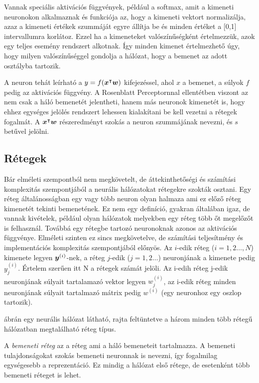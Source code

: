 Vannak speciális aktivációs függvények, például a softmax, amit a kimeneti neuronokon alkalmaznak és funkciója az, hogy a kimeneti vektort normalizálja, azaz a kimeneti értékek szummáját egyre állítja be és minden értéket a [0,1] intervallumra korlátoz. Ezzel ha a kimeneteket valószínűségként értelmezzük, azok egy teljes esemény rendszert alkotnak. Így minden kimenet értelmezhető úgy, hogy milyen valószínűséggel gondolja a hálózat, hogy a bemenet az adott osztályba tartozik.


A neuron tehát leírható a $y = f(\boldsymbol x^\intercal \boldsymbol w)$ kifejezéssel, ahol $x$ a bemenet, \w a súlyok $f$ pedig az aktivációs függvény. A Rosenblatt Perceptornnal ellentétben viszont az \x nem csak a háló bemenetét jelentheti, hanem más neuronok kimenetét is, hogy ehhez egységes jelölés rendszert lehessen kialakítani be kell vezetni a rétegek fogalmát. A $\boldsymbol x^\intercal \boldsymbol w$ részeredményt szokás a neuron szummájának nevezni, és $s$ betűvel jelölni.
 
 
 
 \subsection{Rétegek}
 
Bár elméleti szempontból nem megkövetelt, de áttekinthetőségi és számítási komplexitás szempontjából a neurális hálózatokat rétegekre szokták osztani. Egy réteg általánosságban egy vagy több neuron olyan halmaza ami ez előző réteg kimenetét tekinti bemenetének. Ez nem egy definíció, gyakran általában igaz, de vannak kivételek, például olyan hálózatok melyekben egy réteg több őt megelőzőt is felhasznál. Továbbá  egy rétegbe tartozó neuronoknak azonos az aktivációs függvénye. Elméleti szinten ez sincs megkövetelve, de számítási teljesítmény és implementációs komplexitás szempontjából előnyös.
Az $i$-edik réteg ($i = 1,2\dots, N$) kimenete legyen $\boldsymbol y^{(i)}$-nek, a réteg $j$-edik ($j = 1,2\dots$)  neuronjának a kimenete pedig $y^{(i)}_j$. Értelem szerűen itt N a rétegek számát jelöli. Az i-edih réteg j-edik neuronjának súlyait tartalamazó vektor legyen $w^{(i)}_j$, az i-edik réteg minden neuronjának súlyait tartalmazó mátrix pedig $w^{(i)}$ (egy neuronhoz egy oszlop tartozik).   
 
 ábrán egy neurális hálózat látható, rajta feltüntetve a három minden több rétegű hálózatban megtalálható réteg típus.
 
 A \emph{bemeneti réteg} az a réteg ami a háló bemeneteit tartalmazza. A bemeneti tulajdonságokat szokás bemeneti neuronnak is nevezni, így fogalmilag egységesebb a reprezentáció. Ez mindig a hálózat első rétege, de esetenként több bemeneti réteget is lehet.
 
